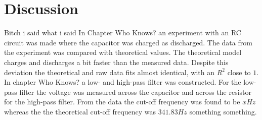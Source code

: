 \chapter{Discussion}
Bitch i said what i said
In Chapter Who Knows? an experiment with an RC circuit was made where the capacitor was charged as discharged. The data from the experiment was compared with theoretical values. The theoretical model charges and discharges a bit faster than the measured data. Despite this deviation the theoretical and raw data fits almost identical, with an $R^2$ close to $1$. 
\\
In chapter Who Knows? a low- and high-pass filter was constructed. For the low-pass filter the voltage was measured across the capacitor and across the resistor for the high-pass filter. From the data the cut-off frequency was found to be $x Hz$ whereas the the theoretical cut-off frequency was $341.83 Hz$ something something.
